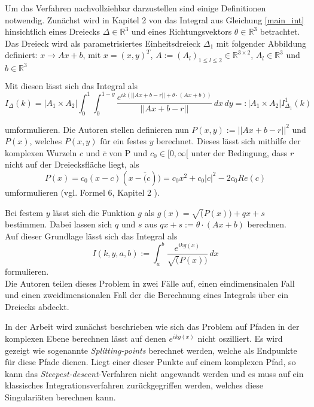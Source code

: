 Um das Verfahren nachvollziehbar darzustellen sind einige Definitionen notwendig.
Zunächst wird in Kapitel 2 von \cite{gasperini:hal-03209144} das Integral aus Gleichung \ref{main_int} hinsichtlich eines Dreiecks $\Delta \in \mathbb{R}^3$ und eines Richtungsvektors $\theta \in \mathbb{R}^3$ betrachtet.
Das Dreieck wird als parametrisiertes Einheitsdreieck $\Delta_1$ mit folgender Abbildung definiert: $x \rightarrow Ax + b$, mit $x = (x,y)^T$, $A:= (A_l)_{1\leq l \leq 2} \in \mathbb{R}^{3\times 2}$, $A_l \in \mathbb{R}^3$ und $b \in \mathbb{R}^3$ 

Mit diesen lässt sich das Integral als
\begin{equation}
    I_{\Delta}(k) = |A_1 \times A_2 | \int_{0}^{1} \int_{0}^{1-y}  \frac{e^{ik(||Ax + b - r|| +\theta \cdot (Ax +b))}}{||Ax + b - r ||}\,dx  \,dy  =: |A_1 \times A_2 | I_{\Delta_1}^1(k)
\end{equation}\label{main_def_int}

umformulieren. Die Autoren stellen definieren nun $P(x,y) := ||Ax+b-r||^2$ und $P(x)$, welches $P(x,y)$ für ein festes $y$ berechnet.
Dieses lässt sich mithilfe der komplexen Wurzeln $c$ und $\overline{c}$ von P und $c_0 \in [0,\infty[$ unter der Bedingung, dass $r$ nicht auf der Dreiecksfläche liegt, als 
\begin{equation}
    P(x) = c_0(x-c)(x-\overline(c))= c_0x^2+c_0|c|^2-2c_0Re(c)
\end{equation}
umformulieren (vgl. Formel 6, Kapitel 2 \cite{gasperini:hal-03209144}).

Bei festem $y$ lässt sich die Funktion $g$ als $g(x) = \sqrt(P(x)) + qx + s$ bestimmen. Dabei lassen sich $q$ und $s$ aus $qx + s := \theta \cdot(Ax+b)$ berechnen.\\

Auf dieser Grundlage lässt sich das Integral als 
\begin{equation}
    I(k,y,a,b) := \int_{a}^{b}  \frac{e^{ikg(x)}}{\sqrt(P(x))}\,dx 
\end{equation}
formulieren.\\


Die Autoren teilen dieses Problem in zwei Fälle auf, einen eindimensinalen Fall und einen zweidimensionalen Fall der die Berechnung eines Integrals über ein Dreiecks abdeckt.


In der Arbeit \cite{gasperini:hal-03209144} wird zunächst beschrieben wie sich das Problem auf Pfaden in der komplexen Ebene berechnen lässt auf denen $e^{ikg(x)}$ nicht oszilliert.
Es wird gezeigt wie sogenannte \textit{Splitting-points} berechnet werden, welche als Endpunkte für diese Pfade dienen.
Liegt einer dieser Punkte auf einem komplexen Pfad, so kann das \textit{Steepest-descent}-Verfahren nicht angewandt werden und es muss auf ein klassisches Integrationsverfahren zurückgegriffen werden, welches diese Singulariäten berechnen kann.


